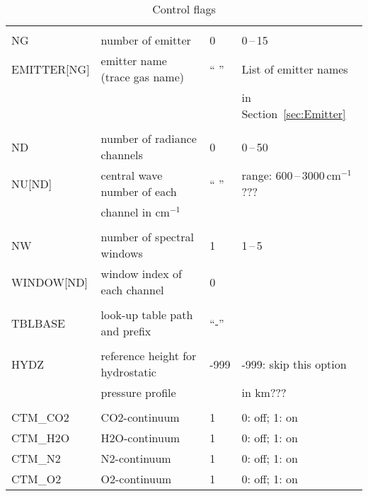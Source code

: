 \begin{table*}[!h]
\caption{Control flags}
\begin{tabular}{|l|l|l|l|}
\hline
\cellcolor[RGB]{188,188,188}{flag name} & \cellcolor[RGB]{188,188,188}{purpose} & 
\cellcolor[RGB]{188,188,188}{default} & \cellcolor[RGB]{188,188,188}{options} \\
\hline
\hline

\multicolumn{4}{|l|}{\cellcolor[RGB]{255,204,230}{Emitter}} \\
\hline
NG          & number of emitter             & 0     & 0\,--\,15 \\
EMITTER[NG] & emitter name (trace gas name) & `` '' & List of emitter names \\
            &                               &       & in Section~\ref{sec:Emitter} \\
\hline
\hline

\multicolumn{4}{|l|}{\cellcolor[RGB]{255,204,230}{Radiance channels}} \\
\hline
ND          & number of radiance channels   & 0     & 0\,--\,50 \\
NU[ND]      & central wave number of each   & `` '' & range: 600\,--\,3000\,cm$^{-1}$ ???\\
            & channel in cm$^{-1}$           &       &  \\
\hline
\hline

\multicolumn{4}{|l|}{\cellcolor[RGB]{255,204,230}{Spectral windows}} \\
\hline
NW          & number of spectral windows    & 1     &  1\,--\,5 \\  
\hline
WINDOW[ND]  & window index of each channel  & 0     &  \\
\hline
\hline

\multicolumn{4}{|l|}{\cellcolor[RGB]{255,204,230}{Emissivity look-up tables}} \\
\hline
TBLBASE     & look-up table path and prefix & ``-'' & \\
\hline
\hline

\multicolumn{4}{|l|}{\cellcolor[RGB]{255,204,230}{Hydrostatic equilibrium}} \\
\hline  
HYDZ        & reference height for hydrostatic & -999 & -999: skip this option \\
            & pressure profile                 &      & in km??? \\
\hline
\hline

\multicolumn{4}{|l|}{\cellcolor[RGB]{255,204,230}{Continua}} \\
\hline
CTM\_CO2     & CO2-continuum                 & 1     & 0: off; 1: on \\
CTM\_H2O     & H2O-continuum                 & 1     & 0: off; 1: on \\
CTM\_N2      & N2-continuum                  & 1     & 0: off; 1: on \\
CTM\_O2      & O2-continuum                  & 1     & 0: off; 1: on \\
\hline
\hline       


\end{tabular}
\end{table*}
